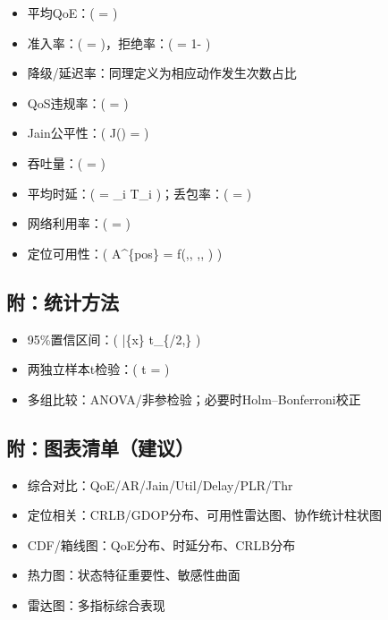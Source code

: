 \begin{itemize}
\tightlist
\item
  平均QoE：(  =  )
\item
  准入率：(  =  )，拒绝率：(
   = 1- )
\item
  降级/延迟率：同理定义为相应动作发生次数占比
\item
  QoS违规率：(  =
   )
\item
  Jain公平性：( J() =  )
\item
  吞吐量：(  =  )
\item
  平均时延：(  = \sum\_i T\_i )；丢包率：(
   =  )
\item
  网络利用率：(  =
   )
\item
  定位可用性：( A\^{}\{pos\} = f(,,
  ,, \mathbb{1}{[}\le\tau{]}) )
\end{itemize}

\subsection{附：统计方法}\label{ux9644ux7edfux8ba1ux65b9ux6cd5}

\begin{itemize}
\tightlist
\item
  95\%置信区间：( \bar\{x\} \pm t\_\{\alpha/2,\nu\}
  \cdot {} )
\item
  两独立样本t检验：( t =
   )
\item
  多组比较：ANOVA/非参检验；必要时Holm--Bonferroni校正
\end{itemize}

\subsection{附：图表清单（建议）}\label{ux9644ux56feux8868ux6e05ux5355ux5efaux8bae-3}

\begin{itemize}
\tightlist
\item
  综合对比：QoE/AR/Jain/Util/Delay/PLR/Thr
\item
  定位相关：CRLB/GDOP分布、可用性雷达图、协作统计柱状图
\item
  CDF/箱线图：QoE分布、时延分布、CRLB分布
\item
  热力图：状态特征重要性、敏感性曲面
\item
  雷达图：多指标综合表现
\end{itemize}

